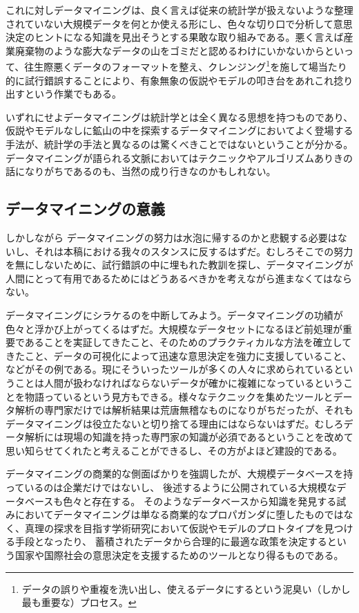 これに対しデータマイニングは、良く言えば従来の統計学が扱えないような整理されていない大規模データを何とか使える形にし、色々な切り口で分析して意思決定のヒントになる知識を見出そうとする果敢な取り組みである。悪く言えば産業廃棄物のような膨大なデータの山をゴミだと認めるわけにいかないからといって、往生際悪くデータのフォーマットを整え、クレンジング\footnote{データの誤りや重複を洗い出し、使えるデータにするという泥臭い（しかし最も重要な）プロセス。}を施して場当たり的に試行錯誤することにより、有象無象の仮説やモデルの叩き台をあれこれ捻り出すという作業でもある。

いずれにせよデータマイニングは統計学とは全く異なる思想を持つものであり、仮説やモデルなしに鉱山の中を探索するデータマイニングにおいてよく登場する手法が、統計学の手法と異なるのは驚くべきことではないということが分かる。データマイニングが語られる文脈においてはテクニックやアルゴリズムありきの話になりがちであるのも、当然の成り行きなのかもしれない。

\subsection{データマイニングの意義}
しかしながら
データマイニングの努力は水泡に帰するのかと悲観する必要はないし、それは本稿における我々のスタンスに反するはずだ。むしろそこでの努力を無にしないために、試行錯誤の中に埋もれた教訓を探し、データマイニングが人間にとって有用であるためにはどうあるべきかを考えながら進まなくてはならない。

データマイニングにシラケるのを中断してみよう。データマイニングの功績が色々と浮かび上がってくるはずだ。大規模なデータセットになるほど前処理が重要であることを実証してきたこと、そのためのプラクティカルな方法を確立してきたこと、データの可視化によって迅速な意思決定を強力に支援していること、などがその例である。現にそういったツールが多くの人々に求められているということは人間が扱わなければならないデータが確かに複雑になっているということを物語っているという見方もできる。様々なテクニックを集めたツールとデータ解析の専門家だけでは解析結果は荒唐無稽なものになりがちだったが、それもデータマイニングは役立たないと切り捨てる理由にはならないはずだ。むしろデータ解析には現場の知識を持った専門家の知識が必須であるということを改めて思い知らせてくれたと考えることができるし、その方がよほど建設的である。

データマイニングの商業的な側面ばかりを強調したが、大規模データベースを持っているのは企業だけではないし、
後述するように公開されている大規模なデータベースも色々と存在する。
そのようなデータベースから知識を発見する試みにおいてデータマイニングは単なる商業的なプロパガンダに堕したものではなく、真理の探求を目指す学術研究において仮説やモデルのプロトタイプを見つける手段となったり、
蓄積されたデータから合理的に最適な政策を決定するという国家や国際社会の意思決定を支援するためのツールとなり得るものである。

